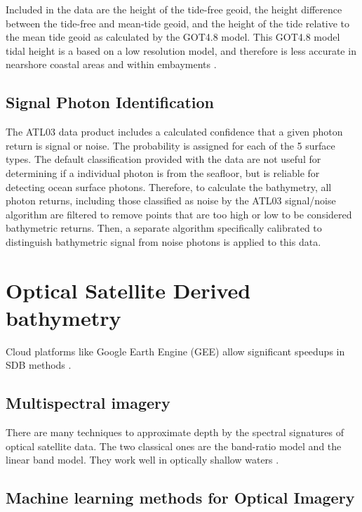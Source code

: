 Included in the data are the height of the tide-free geoid, the height difference between the tide-free and mean-tide geoid, and the height of the tide relative to the mean tide geoid as calculated by the GOT4.8 model. This GOT4.8 model tidal height is a based on a low resolution model, and therefore is less accurate in nearshore coastal areas and within embayments \parencite{Neumann2019e}.

\subsection{Signal Photon Identification}

The ATL03 data product includes a calculated confidence that a given photon return is signal or noise. The probability is assigned for each of the 5 surface types. The default classification provided with the data are not useful for determining if a individual photon is from the seafloor, but is reliable for detecting ocean surface photons. Therefore, to calculate the bathymetry, all photon returns, including those classified as noise by the ATL03 signal/noise algorithm are filtered to remove points that are too high or low to be considered bathymetric returns. Then, a separate algorithm specifically calibrated to distinguish bathymetric signal from noise photons is applied to this data.

\section{Optical Satellite Derived bathymetry}

Cloud platforms like Google Earth Engine (GEE) \parencite{Gorelick2017a} allow significant speedups in SDB methods \parencite{Pike2019}. 


\subsection{Multispectral imagery}

There are many techniques to approximate depth by the spectral signatures of optical satellite data. The two classical ones are the band-ratio model and the linear band model. They work well in optically shallow waters \parencite{Salameh2019}.

\subsection{Machine learning methods for Optical Imagery}


